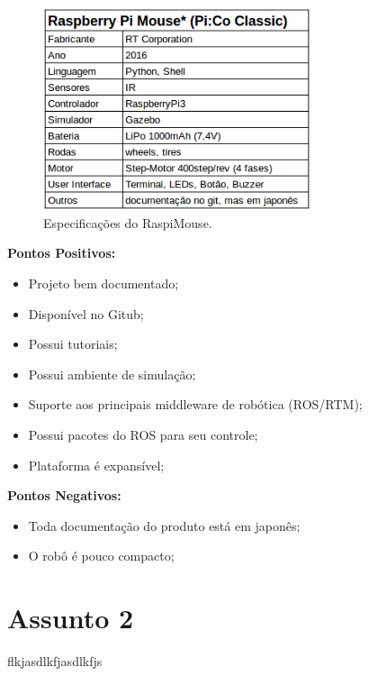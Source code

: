 \begin{figure}[H]
	\centering
	\includegraphics[width=0.7\textwidth]
	{Figures/RaspiMouse.png}
	\caption{\label{fig:RaspiMouse} Especificações do RaspiMouse.}
\end{figure}

\textbf{Pontos Positivos:}
\begin{itemize}
	\item Projeto bem documentado;
	\item Disponível no Gitub;
	\item Possui tutoriais;
	\item Possui ambiente de simulação;
	\item Suporte aos principais middleware de robótica (ROS/RTM);
	\item Possui pacotes do ROS para seu controle;
	\item Plataforma é expansível;
\end{itemize}

\textbf{Pontos Negativos:}
\begin{itemize}
	\item Toda documentação do produto está em japonês;
	\item O robô é pouco compacto;
\end{itemize}

\section{Assunto 2}
\label{sec:ass2}
flkjasdlkfjasdlkfjs

